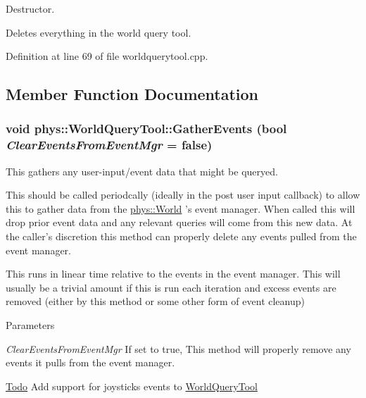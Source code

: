 Destructor. 

Deletes everything in the world query tool. 

Definition at line 69 of file worldquerytool.cpp.



\subsection{Member Function Documentation}
\hypertarget{classphys_1_1WorldQueryTool_ae387ff047f3cdf408d8959b8cbf4cc57}{
\subsubsection[{GatherEvents}]{\setlength{\rightskip}{0pt plus 5cm}void phys::WorldQueryTool::GatherEvents (bool {\em ClearEventsFromEventMgr} = {\ttfamily false})}}
\label{d8/d69/classphys_1_1WorldQueryTool_ae387ff047f3cdf408d8959b8cbf4cc57}


This gathers any user-\/input/event data that might be queryed. 

This should be called periodcally (ideally in the post user input callback) to allow this to gather data from the \hyperlink{classphys_1_1World}{phys::World} 's event manager. When called this will drop prior event data and any relevant queries will come from this new data. At the caller's discretion this method can properly delete any events pulled from the event manager. \par
 \par
 This runs in linear time relative to the events in the event manager. This will usually be a trivial amount if this is run each iteration and excess events are removed (either by this method or some other form of event cleanup) 
\begin{DoxyParams}{Parameters}
\item[{\em ClearEventsFromEventMgr}]If set to true, This method will properly remove any events it pulls from the event manager. \end{DoxyParams}


\begin{Desc}
\item[\hyperlink{todo__todo000023}{Todo}]Add support for joysticks events to \hyperlink{classphys_1_1WorldQueryTool}{WorldQueryTool} \end{Desc}




